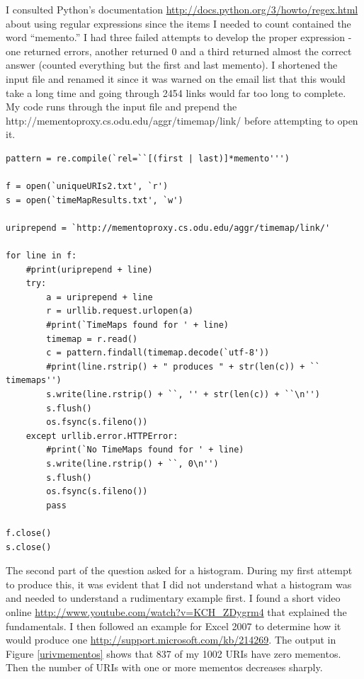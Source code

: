 \documentclass{article}
\begin{document}
I consulted Python's documentation \url{http://docs.python.org/3/howto/regex.html} about using regular expressions since the items I needed to count contained the word ``memento.'' I had three failed attempts to develop the proper expression - one returned errors, another returned 0 and a third returned almost the correct answer (counted everything but the first and last memento). I shortened the input file and renamed it since it was warned on the email list that this would take a long time and going through 2454 links would far too long to complete. My code runs through the input file and prepend the http://mementoproxy.cs.odu.edu/aggr/timemap/link/ before attempting to open it.

\begin{lstlisting}
pattern = re.compile(`rel=``[(first | last)]*memento''')

f = open(`uniqueURIs2.txt', `r')
s = open(`timeMapResults.txt', `w')

uriprepend = `http://mementoproxy.cs.odu.edu/aggr/timemap/link/'

for line in f:
    #print(uriprepend + line)
    try:
        a = uriprepend + line
        r = urllib.request.urlopen(a)
        #print(`TimeMaps found for ' + line)
        timemap = r.read()
        c = pattern.findall(timemap.decode(`utf-8'))
        #print(line.rstrip() + " produces " + str(len(c)) + `` timemaps'')
        s.write(line.rstrip() + ``, '' + str(len(c)) + ``\n'')
        s.flush()
        os.fsync(s.fileno())
    except urllib.error.HTTPError:
        #print(`No TimeMaps found for ' + line)
        s.write(line.rstrip() + ``, 0\n'')
        s.flush()
        os.fsync(s.fileno())
        pass

f.close()
s.close()
\end{lstlisting}

The second part of the question asked for a histogram. During my first attempt to produce this, it was evident that I did not understand what a histogram was and needed to understand a rudimentary example first. I found a short video online \url{http://www.youtube.com/watch?v=KCH_ZDygrm4} that explained the fundamentals. I then followed an example for Excel 2007 to determine how it would produce one \url{http://support.microsoft.com/kb/214269}. The output in Figure \ref{urivmementos} shows that 837 of my 1002 URIs have zero mementos. Then the number of URIs with one or more mementos decreases sharply.
\end{document}
